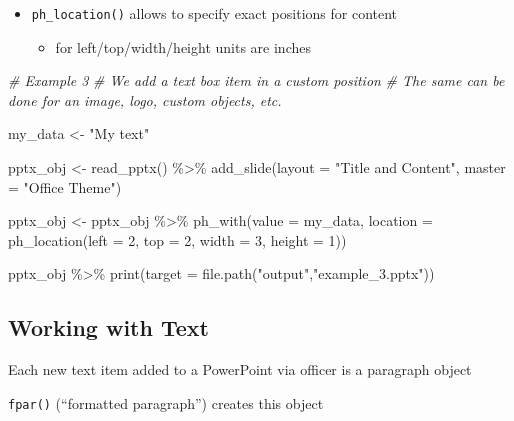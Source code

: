 \documentclass[
]{book}
\newenvironment{Shaded}{\begin{snugshade}}{\end{snugshade}}
\newcommand{\AttributeTok}[1]{\textcolor[rgb]{0.77,0.63,0.00}{#1}}
\newcommand{\CommentTok}[1]{\textcolor[rgb]{0.56,0.35,0.01}{\textit{#1}}}
\newcommand{\DecValTok}[1]{\textcolor[rgb]{0.00,0.00,0.81}{#1}}
\newcommand{\FunctionTok}[1]{\textcolor[rgb]{0.00,0.00,0.00}{#1}}
\newcommand{\NormalTok}[1]{#1}
\newcommand{\OtherTok}[1]{\textcolor[rgb]{0.56,0.35,0.01}{#1}}
\newcommand{\SpecialCharTok}[1]{\textcolor[rgb]{0.00,0.00,0.00}{#1}}
\newcommand{\StringTok}[1]{\textcolor[rgb]{0.31,0.60,0.02}{#1}}
\providecommand{\tightlist}{%
  \setlength{\itemsep}{0pt}\setlength{\parskip}{0pt}}
\begin{document}
\begin{itemize}
\tightlist
\item
  \texttt{ph\_location()} allows to specify exact positions for content

  \begin{itemize}
  \tightlist
  \item
    for left/top/width/height units are inches
  \end{itemize}
\end{itemize}

\begin{Shaded}
\begin{Highlighting}[]
\CommentTok{\# Example 3}
\CommentTok{\# We add a text box item in a custom position}
\CommentTok{\# The same can be done for an image, logo, custom objects, etc.}

\NormalTok{my\_data }\OtherTok{\textless{}{-}} \StringTok{"My text"}

\NormalTok{pptx\_obj }\OtherTok{\textless{}{-}} \FunctionTok{read\_pptx}\NormalTok{() }\SpecialCharTok{\%\textgreater{}\%}
  \FunctionTok{add\_slide}\NormalTok{(}\AttributeTok{layout =} \StringTok{"Title and Content"}\NormalTok{, }\AttributeTok{master =} \StringTok{"Office Theme"}\NormalTok{)}

\NormalTok{pptx\_obj }\OtherTok{\textless{}{-}}\NormalTok{ pptx\_obj }\SpecialCharTok{\%\textgreater{}\%}
  \FunctionTok{ph\_with}\NormalTok{(}\AttributeTok{value =}\NormalTok{ my\_data, }\AttributeTok{location =} \FunctionTok{ph\_location}\NormalTok{(}\AttributeTok{left =} \DecValTok{2}\NormalTok{, }\AttributeTok{top =} \DecValTok{2}\NormalTok{, }\AttributeTok{width =} \DecValTok{3}\NormalTok{, }\AttributeTok{height =} \DecValTok{1}\NormalTok{))}

\NormalTok{pptx\_obj }\SpecialCharTok{\%\textgreater{}\%}
  \FunctionTok{print}\NormalTok{(}\AttributeTok{target =} \FunctionTok{file.path}\NormalTok{(}\StringTok{"output"}\NormalTok{,}\StringTok{"example\_3.pptx"}\NormalTok{))}
\end{Highlighting}
\end{Shaded}

\hypertarget{working-with-text}{%
\subsection{Working with Text}\label{working-with-text}}

Each new text item added to a PowerPoint via officer is a paragraph object

\texttt{fpar()} (``formatted paragraph'') creates this object
\end{document}
